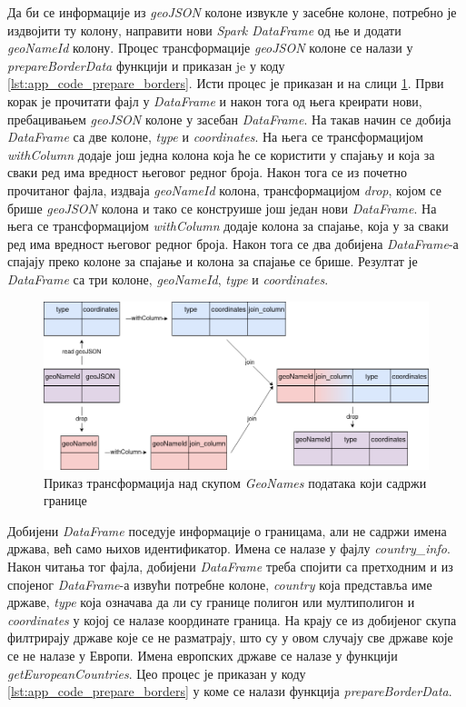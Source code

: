 \documentclass[12pt,oneside]{memoir}
\begin{document}
Да би се информације из \textit{geoJSON} колоне извукле у засебне колоне, потребно је издвојити ту колону, направити нови \textit{Spark DataFrame} од ње и додати \textit{geoNameId} колону. Процес трансформације \textit{geoJSON} колоне се налази у \textit{prepareBorderData} функцији и приказан je у коду \ref{lst:app_code_prepare_borders}. Исти процес је приказан и на слици \ref{fig:app_code_transofrm_prepare_borders}. Први корак је прочитати фајл у \textit{DataFrame} и након тога од њега креирати нови, пребацивањем \textit{geoJSON} колоне у засебан \textit{DataFrame}. На такав начин се добија \textit{DataFrame} са две колоне, \textit{type} и \textit{coordinates}. На њега се трансформацијом \textit{withColumn} додаје још једна колона која ће се користити у спајању и која за сваки ред има вредност његовог редног броја. Након тога се из почетно прочитаног фајла, издваја \textit{geoNameId} колона, трансформацијом \textit{drop}, којом се брише \textit{geoJSON} колона и тако се конструише још један нови \textit{DataFrame}. На њега се трансформацијом \textit{withColumn} додаје колона за спајање, која у за сваки ред има вредност његовог редног броја. Након тога се два добијена \textit{DataFrame}-а спајају преко колоне за спајање и колона за спајање се брише. Резултат је \textit{DataFrame} са три колоне, \textit{geoNameId}, \textit{type} и \textit{coordinates}.

\begin{figure}[!ht]
  \centering
  \includegraphics[width=1\textwidth]{pictures/borders_file_thingy.png}
  \caption{Приказ трансформација над скупом \textit{GeoNames} података који садржи границе}
  \label{fig:app_code_transofrm_prepare_borders}
\end{figure}

Добијени \textit{DataFrame} поседује информације о границама, али не садржи имена држава, већ само њихов идентификатор. Имена се налазе у фајлу \textit{country\_info}. Након читања тог фајла, добијени \textit{DataFrame} треба спојити са претходним и из спојеног \textit{DataFrame}-а извући потребне колоне, \textit{country} која представља име државе, \textit{type} која означава да ли су границе полигон или мултиполигон и \textit{coordinates} у којој се налазе координате граница. На крају се из добијеног скупа филтрирају државе које се не разматрају, што су у овом случају све државе које се не налазе у Европи. Имена европских државе се налазе у функцији \textit{getEuropeanCountries}. Цео процес је приказан у коду \ref{lst:app_code_prepare_borders} у коме се налази функција \textit{prepareBorderData}.
\end{document}
